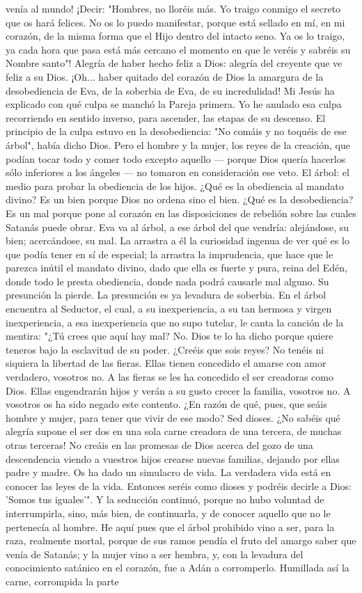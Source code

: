 \documentclass[12pt, twoside, openright]{book} %
\begin{document}
venía al mundo! ¡Decir: "Hombres, no lloréis más. Yo traigo conmigo el secreto que os hará felices. No os lo puedo manifestar, porque está sellado en mí, en mi corazón, de la misma forma que el Hijo dentro del intacto seno. Ya os lo traigo, ya cada hora que pasa está más cercano el momento en que le veréis y sabréis su Nombre santo"! Alegría de haber hecho feliz a Dios: alegría del creyente que ve feliz a su Dios. ¡Oh... haber quitado del corazón de Dios la amargura de la desobediencia de Eva, de la soberbia de Eva, de su incredulidad! Mi Jesús ha explicado con qué culpa se manchó la Pareja primera. Yo he anulado esa culpa recorriendo en sentido inverso, para ascender, las etapas de su descenso. El principio de la culpa estuvo en la desobediencia: "No comáis y no toquéis de ese árbol", había dicho Dios. Pero el hombre y la mujer, los reyes de la creación, que podían tocar todo y comer todo excepto aquello — porque Dios quería hacerlos sólo inferiores a los ángeles — no tomaron en consideración ese veto. El árbol: el medio para probar la obediencia de los hijos. ¿Qué es la obediencia al mandato divino? Es un bien porque Dios no ordena sino el bien. ¿Qué es la desobediencia? Es un mal porque pone al corazón en las disposiciones de rebelión sobre las cuales Satanás puede obrar. Eva va al árbol, a ese árbol del que vendría: alejándose, su bien; acercándose, su mal. La arrastra a él la curiosidad ingenua de ver qué es lo que podía tener en sí de especial; la arrastra la imprudencia, que hace que le parezca inútil el mandato divino, dado que ella es fuerte y pura, reina del Edén, donde todo le presta obediencia, donde nada podrá causarle mal alguno. Su presunción la pierde. La presunción es ya levadura de soberbia. En el árbol encuentra al Seductor, el cual, a su inexperiencia, a su tan hermosa y virgen inexperiencia, a esa inexperiencia que no supo tutelar, le canta la canción de la mentira: "¿Tú crees que aquí hay mal? No. Dios te lo ha dicho porque quiere teneros bajo la esclavitud de su poder. ¿Creéis que sois reyes? No tenéis ni siquiera la libertad de las fieras. Ellas tienen concedido el amarse con amor verdadero, vosotros no. A las fieras se les ha concedido el ser creadoras como Dios. Ellas engendrarán hijos y verán a su gusto crecer la familia, vosotros no. A vosotros os ha sido negado este contento. ¿En razón de qué, pues, que seáis hombre y mujer, para tener que vivir de ese modo? Sed dioses. ¿No sabéis qué alegría supone el ser dos en una sola carne creadora de una tercera, de muchas otras terceras! No creáis en las promesas de Dios acerca del gozo de una descendencia viendo a vuestros hijos crearse nuevas familias, dejando por ellas padre y madre. Os ha dado un simulacro de vida. La verdadera vida está en conocer las leyes de la vida. Entonces seréis como dioses y podréis decirle a Dios: 'Somos tus iguales'". Y la seducción continuó, porque no hubo voluntad de interrumpirla, sino, más bien, de continuarla, y de conocer aquello que no le pertenecía al hombre. He aquí pues que el árbol prohibido vino a ser, para la raza, realmente mortal, porque de sus ramos pendía el fruto del amargo saber que venía de Satanás; y la mujer vino a ser hembra, y, con la levadura del conocimiento satánico en el corazón, fue a Adán a corromperlo. Humillada así la carne, corrompida la parte 
\end{document}
